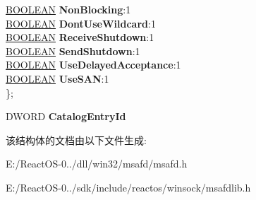 \begin{DoxyCompactItemize}
\begin{tabbing}
\>\hyperlink{_processor_bind_8h_a112e3146cb38b6ee95e64d85842e380a}{BOOLEAN} {\bfseries NonBlocking}:1\\
\>\hyperlink{_processor_bind_8h_a112e3146cb38b6ee95e64d85842e380a}{BOOLEAN} {\bfseries DontUseWildcard}:1\\
\>\hyperlink{_processor_bind_8h_a112e3146cb38b6ee95e64d85842e380a}{BOOLEAN} {\bfseries ReceiveShutdown}:1\\
\>\hyperlink{_processor_bind_8h_a112e3146cb38b6ee95e64d85842e380a}{BOOLEAN} {\bfseries SendShutdown}:1\\
\>\hyperlink{_processor_bind_8h_a112e3146cb38b6ee95e64d85842e380a}{BOOLEAN} {\bfseries UseDelayedAcceptance}:1\\
\>\hyperlink{_processor_bind_8h_a112e3146cb38b6ee95e64d85842e380a}{BOOLEAN} {\bfseries UseSAN}:1\\
\}; \\

\end{tabbing}\item 
\mbox{\label{struct___s_o_c_k___s_h_a_r_e_d___i_n_f_o_aef8b86ad468b0fb56d30ca7c60b5909b}} 
D\+W\+O\+RD {\bfseries Catalog\+Entry\+Id}
\end{DoxyCompactItemize}


该结构体的文档由以下文件生成\+:\begin{DoxyCompactItemize}
\item 
E\+:/\+React\+O\+S-\/0../dll/win32/msafd/msafd.\+h\item 
E\+:/\+React\+O\+S-\/0../sdk/include/reactos/winsock/msafdlib.\+h\end{DoxyCompactItemize}
